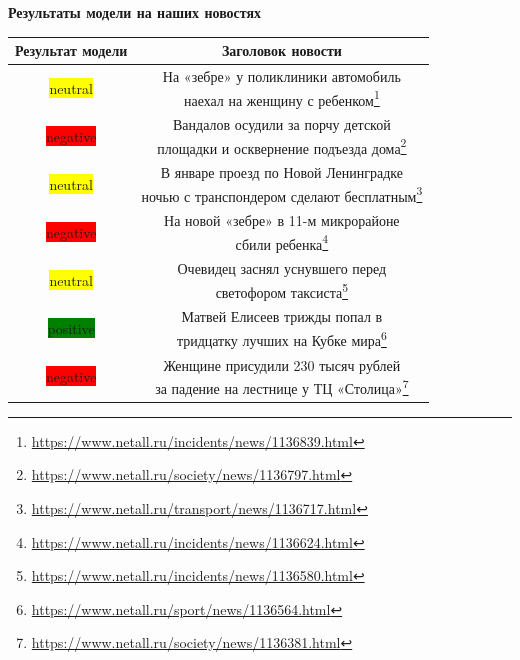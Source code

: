 \documentclass[12pt]{article}
\begin{document}
            \textbf{Результаты модели на наших новостях}
            \begin{center}
                \begin{tabular}{|c|c|}
                \hline
                \textbf{Результат модели} & \textbf{Заголовок новости}\\ 
                \hline
                \colorbox{yellow}{neutral} & \makecell{На «зебре» у поликлиники автомобиль \\ наехал на женщину с ребенком\footnote{\href{https://www.netall.ru/incidents/news/1136839.html}{https://www.netall.ru/incidents/news/1136839.html}}}\\ 
                \hline
                \colorbox{red}{negative} & \makecell{Вандалов осудили за порчу детской \\ площадки и осквернение подъезда дома\footnote{\href{https://www.netall.ru/society/news/1136797.html}{https://www.netall.ru/society/news/1136797.html}}}\\
                \hline
                \colorbox{yellow}{neutral} & \makecell{В январе проезд по Новой Ленинградке \\ ночью с транспондером сделают бесплатным\footnote{\href{https://www.netall.ru/transport/news/1136717.html}{https://www.netall.ru/transport/news/1136717.html}}}\\
                \hline
                \colorbox{red}{negative} & \makecell{На новой «зебре» в 11-м микрорайоне \\ сбили ребенка\footnote{\href{https://www.netall.ru/incidents/news/1136624.html}{https://www.netall.ru/incidents/news/1136624.html}}}\\
                \hline
                \colorbox{yellow}{neutral} & \makecell{Очевидец заснял уснувшего перед \\ светофором таксиста\footnote{\href{https://www.netall.ru/incidents/news/1136580.html}{https://www.netall.ru/incidents/news/1136580.html}}}\\
                \hline
                \colorbox{green}{positive} & \makecell{Матвей Елисеев трижды попал в \\ тридцатку лучших на Кубке мира\footnote{\href{https://www.netall.ru/sport/news/1136564.html}{https://www.netall.ru/sport/news/1136564.html}}}\\
                \hline
                \colorbox{red}{negative} & \makecell{Женщине присудили 230 тысяч рублей \\ за падение на лестнице у ТЦ «Столица»\footnote{\href{https://www.netall.ru/society/news/1136381.html}{https://www.netall.ru/society/news/1136381.html}}}\\

\end{tabular}
\end{center}
\end{document}
